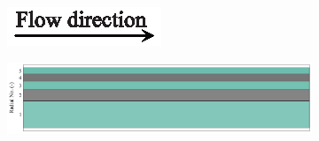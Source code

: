 \documentclass[preprint,12pt]{elsarticle}
\begin{document}
\begin{figure}
     \centering
     \begin{subfigure}[b]{\textwidth}
     	\includegraphics[width=\textwidth]{flow_dir.eps}
     \end{subfigure}
     \begin{subfigure}[b]{0.85\textwidth}
\includegraphics[width=\textwidth]{results/segments/5segEq/40C60T/seg.png}
     \end{subfigure}
     \hfill
     \begin{subfigure}[b]{0.1\textwidth}

\end{subfigure}
\end{figure}
\end{document}
